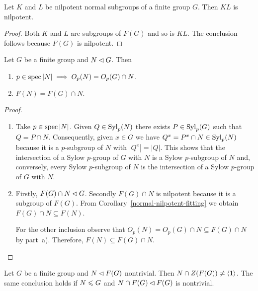 \begin{cor}
    Let\/ $K$ and\/ $L$ be nilpotent normal subgroups of a finite group\/ $G$. Then\/ $KL$ is nilpotent.
\end{cor}

\begin{proof} Both $K$ and $L$ are subgroups of $F(G)$ and so is $KL$. The conclusion follows because $F(G)$ is nilpotent.  \end{proof}

\begin{cor}\label{fitting-intersection-normal}
    Let $G$ be a finite group and $N\lhd G$. Then
    \begin{enumerate}[\rm a)]
        \item $p\in\operatorname{spec}|N|\implies O_p(N)=O_p(G)\cap N$.
        \item $F(N)=F(G)\cap N$.
    \end{enumerate}
\end{cor}

\begin{proof}${}$
\begin{enumerate}[\rm a)]
    \item Take $p\in\operatorname{spec}|N|$. Given $Q\in{\rm Syl}_p(N)$ there exists $P\in{\rm Syl}_p(G)$ such that $Q=P\cap N$. Consequently, given $x\in G$ we have $Q^x=P^x\cap N\in{\rm Syl}_p(N)$ because it is a $p$-subgroup of $N$ with $|Q^x|=|Q|$. This shows that the intersection of a Sylow $p$-group of $G$ with $N$ is a Sylow $p$-subgroup of $N$ and, conversely, every Sylow $p$-subgroup of $N$ is the intersection of a Sylow $p$-group of $G$ with $N$.

    \item Firstly, $F(G)\cap N\lhd G$. Secondly $F(G)\cap N$ is nilpotent because it is a subgroup of $F(G)$. From Corollary~\ref{normal-nilpotent-fitting} we obtain $F(G)\cap N\subseteq F(N)$.

    For the other inclusion observe that $O_p(N) = O_p(G)\cap N\subseteq F(G)\cap N$ by part~a). Therefore, $F(N)\subseteq F(G)\cap N$.
\end{enumerate}
\end{proof}

\begin{prop}\label{nontrivial-fitting-center}
    Let\/ $G$ be a finite group and\/ $N\lhd F(G)$ nontrivial. Then $N\cap Z(F(G))\ne\langle1\rangle$. The same conclusion holds if\/ $N\leqslant G$ and\/ $N\cap F(G)\lhd F(G)$ is nontrivial.
\end{prop}


